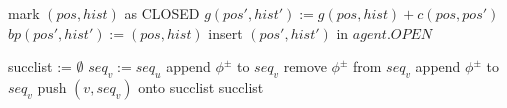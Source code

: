 \documentclass[letterpaper]{article}
\begin{document}
\begin{algorithm}
\caption{$expand(pos, hist)$}
\label{alg:update}
\begin{algorithmic}
\STATE mark $(pos, hist)$ as CLOSED
\STATE $g(pos', hist') := g(pos, hist) + c(pos, pos')$
\STATE $bp(pos', hist') := (pos, hist)$
\STATE insert $(pos', hist')$ in $agent.OPEN$
\ENDIF
\ENDIF
\ENDFOR
\end{algorithmic}
\end{algorithm}

\begin{comment}

\begin{algorithm}
\caption{$MultiAgent A^*HighLevel()$}
\label{alg:update}
\begin{algorithmic}
\STATE $\forall i:\; s_i := start_i$
\WHILE {$g(goal_1, \ldots, goal_N) > f(s_1,\ldots,s_N)$}
\STATE $\forall i:\; expand(s_i)$
\STATE $(s_1,\ldots,s_N) = \arg\min_{s_1,\ldots,s_N} f(s_1,\ldots,s_N)$
\ENDWHILE
\end{algorithmic}
\end{algorithm}

\begin{algorithm}
\caption{$f(s)$}
\label{alg:update}
\begin{algorithmic}
\STATE $f := \infty$
\FORALL {tuples $s_{1\ldots N}\in OPEN$ that include $s$}
\STATE $f := \min(f, jointPriority(s_{1\ldots N}))$
\ENDFOR
\RETURN $f$
\end{algorithmic}
\end{algorithm}

\end{comment}

\begin{algorithm}
\caption{$successors(u, seq_u)$}
\label{alg:update}
\begin{algorithmic}
\STATE succlist := $\emptyset$
\STATE $seq_v := seq_u$
\STATE append $\phi^\pm$ to $seq_v$
\ENDFOR
{}
\STATE remove $\phi^\pm$ from $seq_v$
\STATE append $\phi^\pm$ to $seq_v$
\ENDFOR
\STATE push $(v,seq_v)$ onto succlist
\ENDFOR
\RETURN succlist
\end{algorithmic}
\end{algorithm}
\end{document}
